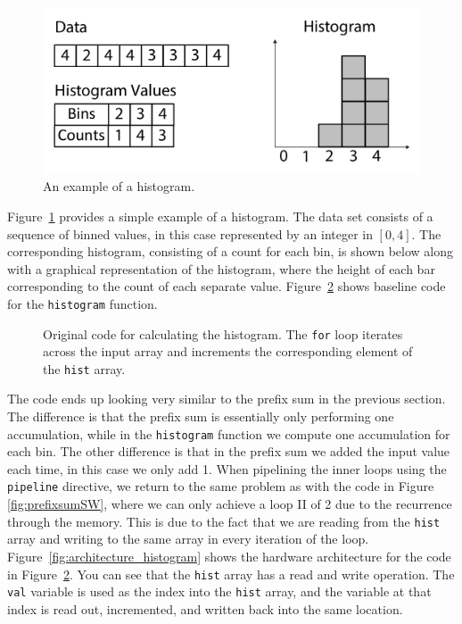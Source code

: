 \begin{figure}
\centering
\includegraphics[width=  .7\textwidth]{images/histogram_introd}
\caption{ An example of a histogram.  }
\label{fig:histogram_introd}
\end{figure}

Figure~\ref{fig:histogram_introd} provides a simple example of a histogram.  The data set consists of a sequence of binned values, in this case represented by an integer in $[0,4]$. The corresponding histogram, consisting of a count for each bin, is shown below along with a graphical representation of the histogram, where the height of each bar corresponding to the count of each separate value.  Figure~\ref{fig:histogramSW} shows baseline code for the \lstinline{histogram} function.

\begin{figure}

\caption{ Original code for calculating the histogram. The \lstinline{for} loop iterates across the input array and increments the corresponding element of the \lstinline{hist} array. }
\label{fig:histogramSW}
\end{figure}

The code ends up looking very similar to the prefix sum in the previous section.  The difference is that the prefix sum is essentially only performing one accumulation, while in the \lstinline|histogram| function we compute one accumulation for each bin.  The other difference is that in the prefix sum we added the input value each time, in this case we only add 1.  When pipelining the inner loops using the \lstinline|pipeline| directive, we return to the same problem as with the code in Figure \ref{fig:prefixsumSW}, where we can only achieve a loop II of 2 due to the recurrence through the memory.   This is due to the fact that we are reading from the \lstinline{hist} array and writing to the same array in every iteration of the loop.  
Figure~\ref{fig:architecture_histogram} shows the hardware architecture for the code in Figure~\ref{fig:histogramSW}. You can see that the \lstinline{hist} array has a read and write operation. The \lstinline{val} variable is used as the index into the \lstinline{hist} array, and the variable at that index is read out, incremented, and written back into the same location.

